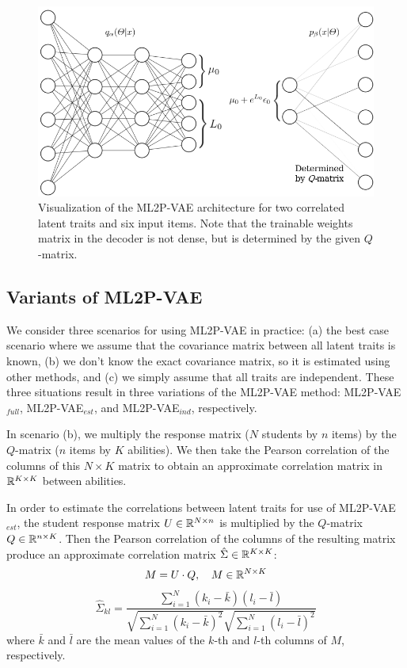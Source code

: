 \begin{figure}[h]
  \centering
  \includegraphics[width=.85\textwidth]{img/ml2pvae_visual.png}
  \caption{Visualization of the ML2P-VAE architecture for two correlated latent traits and six input items. Note that the trainable weights matrix in the decoder is not dense, but is determined by the given $Q$-matrix.}
  \label{fig:ml2pvae_visual}
\end{figure}


\subsection{Variants of ML2P-VAE}\label{sec:variants}

We consider three scenarios for using ML2P-VAE in practice: (a) the best case scenario where we assume that the covariance matrix between all latent traits is known, (b) we don't know the exact covariance matrix, so it is estimated using other methods, and (c) we simply assume that all traits are independent. These three situations result in three variations of the ML2P-VAE method: ML2P-VAE$_{full}$, ML2P-VAE$_{est}$, and ML2P-VAE$_{ind}$, respectively. 

In scenario (b), we multiply the response matrix ($N$ students by $n$ items) by the $Q$-matrix ($n$ items by $K$ abilities). We then take the Pearson correlation of the columns of this $N\times K$ matrix to obtain an approximate correlation matrix in $\mathbb{R}^{K\times K}$ between abilities.

In order to estimate the correlations between latent traits for use of ML2P-VAE$_{est}$, the student response matrix $U \in \mathbb{R}^{N\times n}$ is multiplied by the $Q$-matrix $Q \in \mathbb{R}^{n \times K}$. Then the Pearson correlation of the columns of the resulting matrix produce an approximate correlation matrix $\hat \Sigma \in \mathbb{R}^{K \times K}$: 
\[M = U \cdot Q , \quad M \in \mathbb{R}^{N\times K}\]
\begin{equation}
  \hat \Sigma_{kl} = \frac{\sum_{i=1}^N (k_i - \bar k)(l_i - \bar l)}{\sqrt{\sum_{i=1}^N(k_i - \bar k)^2} \sqrt{\sum_{i=1}^N (l_i - \bar l)^2}}
  \label{eq:approx_cor_mat}
\end{equation}
where $\bar k$ and $\bar l$ are the mean values of the $k$-th and $l$-th columns of $M$, respectively.

